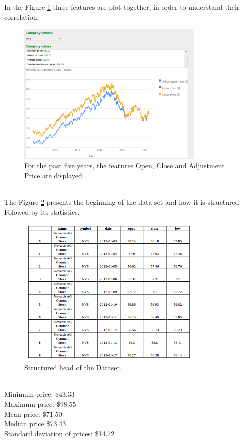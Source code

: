 In the Figure \ref{fig:nvs_stock_results} three features are plot together, in order to understand their correlation.
\begin{figure}[H]
\centering
\includegraphics[width=0.8\textwidth]{figures/nvs_stock_results2.png}
\caption{\label{fig:data}For the past five years, the features Open, Close and Adjustment Price are displayed.}
\label{fig:nvs_stock_results}
\end{figure}
\ \\
The Figure \ref{fig:dataset} presents the beginning of the data set and how it is structured. Folowed by its statistics.
\begin{figure}[H]
\centering
\includegraphics[width=0.8\textwidth]{figures/dataset.png}
\caption{\label{fig:data}Structured head of the Dataset.}
\label{fig:dataset}
\end{figure}
\ \\
Minimum price: \$43.33\\
Maximum price: \$98.55\\
Mean price: \$71.50\\
Median price \$73.43\\
Standard deviation of prices: \$14.72\\


